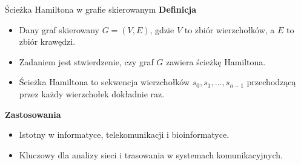 \begin{frame}{Ścieżka Hamiltona w grafie skierowanym}
\textbf{Definicja}
\begin{itemize}
	\item Dany graf skierowany $G = (V, E)$, gdzie $V$ to zbiór wierzchołków, a $E$ to zbiór krawędzi.
	\item Zadaniem jest stwierdzenie, czy graf $G$ zawiera ścieżkę Hamiltona.
	\item Ścieżka Hamiltona to sekwencja wierzchołków $s_0, s_1,…, s_{n−1}$ przechodzącą przez każdy wierzchołek dokładnie raz.	
\end{itemize}
\vspace{10pt}

\textbf{Zastosowania}
\begin{itemize}
	\item Istotny w informatyce, telekomunikacji i bioinformatyce.
	\item Kluczowy dla analizy sieci i trasowania w systemach komunikacyjnych.
\end{itemize}
\end{frame}